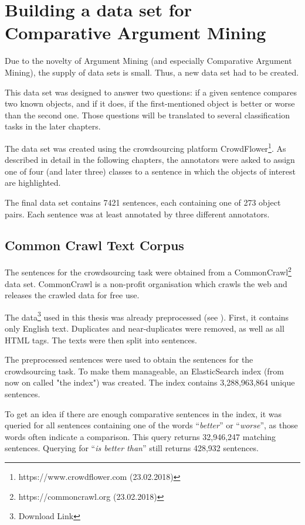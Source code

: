 \chapter{Building a data set for Comparative Argument Mining}
\label{sec:prestudy}
Due to the novelty of Argument Mining (and especially Comparative Argument Mining), the supply of data sets is small. Thus, a new data set had to be created.

This data set was designed to answer two questions: if a given sentence compares two known objects, and if it does, if the first-mentioned object is better or worse than the second one. Those questions will be translated to several classification tasks in the later chapters.

The data set was created using the crowdsourcing platform CrowdFlower\footnote{https://www.crowdflower.com (23.02.2018)}. As described in detail in the following chapters, the annotators were asked to assign one of four (and later three) classes to a sentence in which the objects of interest are highlighted.

The final data set contains 7421 sentences, each containing one of 273 object pairs. Each sentence was at least annotated by three different annotators.

\section{Common Crawl Text Corpus}
The sentences for the crowdsourcing task were obtained from a CommonCrawl\footnote{https://commoncrawl.org (23.02.2018)} data set. CommonCrawl is a non-profit organisation which crawls the web and releases the crawled data for free use.

The data\footnote{Download Link} used in this thesis was already preprocessed (see \cite{Panchenko:2017aa}). First, it contains only English text. Duplicates and near-duplicates were removed, as well as all HTML tags. The texts were then split into sentences.

The preprocessed sentences were used to obtain the sentences for the crowdsourcing task. To make them manageable, an ElasticSearch index (from now on called "the index") was created. The index contains 3,288,963,864 unique sentences.

To get an idea if there are enough comparative sentences in the index, it was queried for all sentences containing one of the words \enquote{\emph{better}} or \enquote{\emph{worse}},  as those words often indicate a comparison. This query returns 32,946,247 matching sentences. Querying for \enquote{\emph{is better than}} still returns 428,932 sentences.

